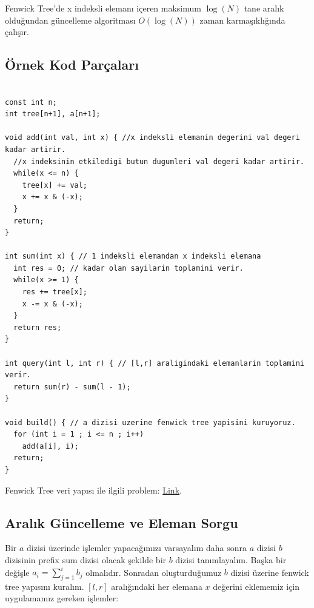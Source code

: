 \documentclass[12pt]{article}
\begin{document}
    Fenwick Tree'de x indeksli eleman{\i} i\c{c}eren maksimum $\log(N)$ tane aral{\i}k oldu\u{g}undan g\"{u}ncelleme algoritmas{\i} $O(\log(N))$ zaman karma\c{s}{\i}kl{\i}\u{g}{\i}nda \c{c}al{\i}\c{s}{\i}r.
    
    \clearpage
    
    \subsection{\"{O}rnek Kod Par\c{c}alar{\i}}
    
    \begin{verbatim}
    
const int n;
int tree[n+1], a[n+1];

void add(int val, int x) { //x indeksli elemanin degerini val degeri kadar artirir.
  //x indeksinin etkiledigi butun dugumleri val degeri kadar artirir.
  while(x <= n) {
    tree[x] += val;
    x += x & (-x);
  }
  return;
}

int sum(int x) { // 1 indeksli elemandan x indeksli elemana
  int res = 0; // kadar olan sayilarin toplamini verir.
  while(x >= 1) {
    res += tree[x];
    x -= x & (-x);
  }
  return res;
}

int query(int l, int r) { // [l,r] araligindaki elemanlarin toplamini verir.
  return sum(r) - sum(l - 1);
}

void build() { // a dizisi uzerine fenwick tree yapisini kuruyoruz.
  for (int i = 1 ; i <= n ; i++)
    add(a[i], i);
  return;
}

    \end{verbatim}
    
    Fenwick Tree veri yap{\i}s{\i} ile ilgili problem: \href{https://www.spoj.com/problems/CSUMQ/}{Link}.
    
    \subsection{Aral{\i}k G\"{u}ncelleme ve Eleman Sorgu}

    Bir $a$ dizisi \"{u}zerinde i\c{s}lemler yapaca\u{g}{\i}m{\i}z{\i} varsayal{\i}m daha sonra $a$ dizisi $b$ dizisinin prefix sum dizisi olacak \c{s}ekilde bir $b$ dizisi tan{\i}mlayal{\i}m. Ba\c{s}ka bir de\u{g}i\c{s}le $a_i = \sum_{j=1}^{i} {b_j} $ olmal{\i}d{\i}r. Sonradan olu\c{s}turdu\u{g}umuz $b$ dizisi \"{u}zerine fenwick tree yap{\i}s{\i}n{\i} kural{\i}m. $[l,r]$ aral{\i}\u{g}{\i}ndaki her elemana
    $x$ de\u{g}erini eklememiz i\c{c}in uygulamam{\i}z gereken i\c{s}lemler:
    
\end{document}
